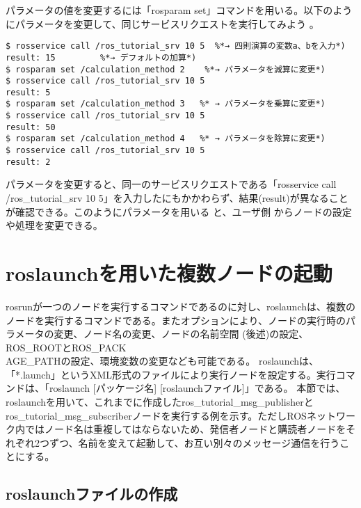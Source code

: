 パラメータの値を変更するには「rosparam set」コマンドを用いる。以下のようにパラメータを変更して、同じサービスリクエストを実行してみよう  。

\begin{lstlisting}[language=ROS]
$ rosservice call /ros_tutorial_srv 10 5  %*→ 四則演算の変数a、bを入力*)
result: 15         %*→ デフォルトの加算*)
$ rosparam set /calculation_method 2    %*→ パラメータを減算に変更*)
$ rosservice call /ros_tutorial_srv 10 5
result: 5
$ rosparam set /calculation_method 3   %* → パラメータを乗算に変更*)
$ rosservice call /ros_tutorial_srv 10 5
result: 50
$ rosparam set /calculation_method 4   %* → パラメータを除算に変更*)
$ rosservice call /ros_tutorial_srv 10 5
result: 2
\end{lstlisting}

パラメータを変更すると、同一のサービスリクエストである「rosservice call /ros\_tutorial\_srv 10 5」を入力したにもかかわらず、結果(result)が異なることが確認できる。このようにパラメータを用いる  と、ユーザ側 からノードの設定や処理を変更できる。

\section{roslaunchを用いた複数ノードの起動}

rosrunが一つのノードを実行するコマンドであるのに対し、roslaunchは、複数のノードを実行するコマンドである。またオプションにより、ノードの実行時のパラメータの変更、ノード名の変更、ノードの名前空間  (後述)の設定、ROS\_ROOTとROS\_PACK\\AGE\_PATHの設定、環境変数の変更なども可能である。
roslaunchは、「*.launch」というXML形式のファイルにより実行ノードを設定する。実行コマンドは、「roslaunch [パッケージ名] [roslaunchファイル]」である。
本節では、roslaunchを用いて、これまでに作成したros\_tutorial\_msg\_publisherとros\_tutorial\_msg\_subscriberノードを実行する例を示す。ただしROSネットワーク内ではノード名は重複してはならないため、発信者ノードと購読者ノードをそれぞれ2つずつ、名前を変えて起動して、お互い別々のメッセージ通信を行うことにする。

\subsection{roslaunchファイルの作成}

